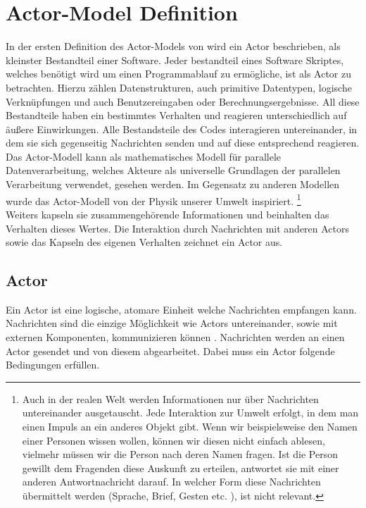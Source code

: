 \section{Actor-Model Definition}\label{actor:definition}
In der ersten Definition des Actor-Models von \citep{hewitt1973session} wird ein Actor beschrieben, als kleinster Bestandteil einer Software. Jeder bestandteil eines Software Skriptes, welches benötigt wird um einen Programmablauf zu ermögliche, ist als Actor zu betrachten. Hierzu zählen Datenstrukturen, auch primitive Datentypen, logische Verknüpfungen und auch Benutzereingaben oder Berechnungsergebnisse. All diese Bestandteile haben ein bestimmtes Verhalten und reagieren unterschiedlich auf äußere Einwirkungen. Alle Bestandsteile des Codes interagieren untereinander, in dem sie sich gegenseitig Nachrichten senden und auf diese entsprechend reagieren.\\
Das Actor-Modell kann als mathematisches Modell für parallele Datenverarbeitung, welches Akteure als universelle Grundlagen der parallelen Verarbeitung verwendet, gesehen werden. Im Gegensatz zu anderen Modellen wurde das Actor-Modell von der Physik unserer Umwelt inspiriert. \footnote{Auch in der realen Welt werden Informationen nur über Nachrichten untereinander ausgetauscht. Jede Interaktion zur Umwelt erfolgt, in dem man einen Impuls an ein anderes Objekt gibt. Wenn wir beispielsweise den Namen einer Personen wissen wollen, können wir diesen nicht einfach ablesen, vielmehr müssen wir die Person nach deren Namen fragen. Ist die Person gewillt dem Fragenden diese Auskunft zu erteilen, antwortet sie mit einer anderen Antwortnachricht darauf. In welcher Form diese Nachrichten übermittelt werden (Sprache, Brief, Gesten etc. ), ist nicht relevant.} \citep{Vernon2015ReactiveAkka} \\ 
Weiters kapseln sie zusammengehörende Informationen und beinhalten das Verhalten dieses Wertes. Die Interaktion durch Nachrichten mit anderen Actors sowie das Kapseln des eigenen Verhalten zeichnet ein Actor aus.

\subsection{Actor}
Ein Actor ist eine logische, atomare Einheit welche Nachrichten empfangen kann. Nachrichten sind die einzige Möglichkeit wie Actors untereinander, sowie mit externen Komponenten, kommunizieren können \citep{Agha1985ConcurrentParallelism}. Nachrichten werden an einen Actor gesendet und von diesem abgearbeitet. Dabei muss ein Actor folgende Bedingungen erfüllen.

